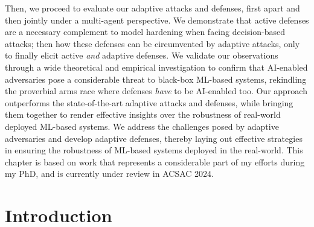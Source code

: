 Then, we proceed to evaluate our adaptive attacks and defenses, first apart and then jointly under a multi-agent perspective.
We demonstrate that active defenses are a necessary complement to model hardening when facing decision-based attacks; then how these defenses can be circumvented by adaptive attacks, only to finally elicit active \emph{and} adaptive defenses.
We validate our observations through a wide theoretical and empirical investigation to confirm that AI-enabled adversaries pose a considerable threat to black-box ML-based systems, rekindling the proverbial arms race where defenses \emph{have} to be AI-enabled too.
Our approach outperforms the state-of-the-art adaptive attacks and defenses, while bringing them together to render effective insights over the robustness of real-world deployed ML-based systems.
We address the challenges posed by adaptive adversaries and develop adaptive defenses, thereby laying out effective strategies in ensuring the robustness of ML-based systems deployed in the real-world.
This chapter is based on work that represents a considerable part of my efforts during my PhD, and is currently under review in ACSAC 2024.

\section{Introduction}



